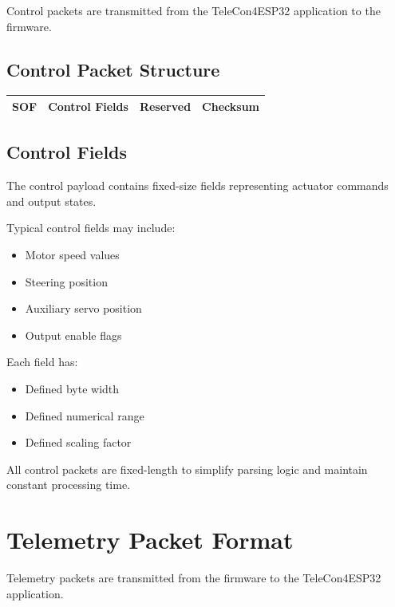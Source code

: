 Control packets are transmitted from the TeleCon4ESP32 application to the firmware.

\subsection{Control Packet Structure}

\begin{center}
	\begin{tabular}{|c|c|c|c|}
		\hline
		SOF & Control Fields & Reserved & Checksum \\
		\hline
	\end{tabular}
\end{center}

\subsection{Control Fields}

The control payload contains fixed-size fields representing actuator commands and output states.

Typical control fields may include:

\begin{itemize}
	\item Motor speed values
	\item Steering position
	\item Auxiliary servo position
	\item Output enable flags
\end{itemize}

Each field has:

\begin{itemize}
	\item Defined byte width
	\item Defined numerical range
	\item Defined scaling factor
\end{itemize}

All control packets are fixed-length to simplify parsing logic and maintain constant processing time.


\section{Telemetry Packet Format}

Telemetry packets are transmitted from the firmware to the TeleCon4ESP32 application.

